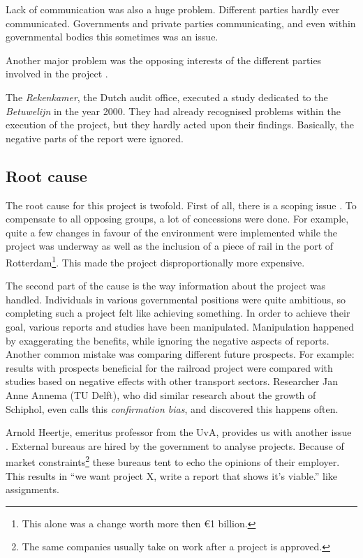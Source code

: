 \documentclass[]{uva-bachelor-thesis}
\begin{document}
Lack of communication was also a huge problem. 
Different parties hardly ever communicated. 
Governments and private parties communicating, and even within governmental bodies this sometimes was an issue. 

Another major problem was the opposing interests of the different parties involved in the project \cite{de2012verstrikking}.


The \emph{Rekenkamer}, the Dutch audit office, executed a study dedicated \cite{beleidsinformatie-betuweroute} to the \emph{Betuwelijn} in the year 2000.
They had already recognised problems within the execution of the project, but they hardly acted upon their findings.
Basically, the negative parts of the report were ignored.

\subsection{Root cause}
The root cause for this project is twofold. 
First of all, there is a scoping issue \cite{de2012verstrikking}. 
To compensate to all opposing groups, a lot of concessions were done. 
For example, quite a few changes in favour of the environment were implemented while the project was underway as well as the inclusion of a piece of rail in the port of Rotterdam\footnote{This alone was a change worth more then \euro 1 billion.}. 
This made the project disproportionally more expensive.

The second part of the cause is the way information about the project was handled. 
Individuals in various governmental positions were quite ambitious, so completing such a project felt like achieving something. 
In order to achieve their goal, various reports and studies have been manipulated. 
Manipulation happened by exaggerating the benefits, while ignoring the negative aspects of reports\cite{eenvandaag, commissie-duivesteijn, de2012verstrikking}. 
Another common mistake was comparing different future prospects.
For example: results with prospects beneficial for the railroad project were compared with studies based on negative effects with other transport sectors\cite{commissie-duivesteijn}. 
Researcher Jan Anne Annema (TU Delft), who did similar research about the growth of Schiphol, even calls this \emph{confirmation bias}\cite{huys2009politics, kahneman}, and discovered this happens often.

Arnold Heertje, emeritus professor from the UvA, provides us with another issue \cite{eenvandaag}.
External bureaus are hired by the government to analyse projects.
Because of market constraints\footnote{The same companies usually take on work after a project is approved.} these bureaus tent to echo the opinions of their employer. 
This results in ``we want project X, write a report that shows it's viable.'' like assignments.
\end{document}
